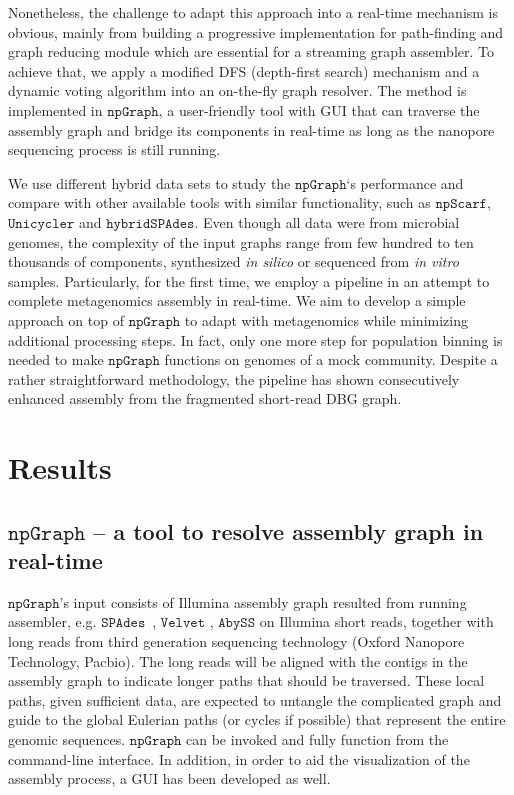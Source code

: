 \documentclass[10pt,twocolumn,twoside]{genpaper}
\newcommand{\npscarf}{$\mathtt{npScarf}$}
\newcommand{\npgraph}{$\mathtt{npGraph}$}
\newcommand{\unicycler}{$\mathtt{Unicycler}$}
\newcommand{\spades}{$\mathtt{SPAdes}$}
\newcommand{\hspades}{$\mathtt{hybridSPAdes}$}
\begin{document}
Nonetheless, the challenge to adapt this approach into a real-time mechanism is obvious, mainly from building a progressive implementation for path-finding and graph reducing module which are essential for a streaming graph assembler. 
To achieve that, we apply a modified DFS (depth-first search) mechanism and a dynamic voting algorithm into an on-the-fly graph resolver.
The method is implemented in \npgraph{}, a user-friendly tool with GUI that can traverse the assembly graph and bridge its components in real-time as long as the nanopore sequencing process is still running. 
 
We use different hybrid data sets to study the \npgraph{}`s performance and compare with other available tools with similar functionality, such as \npscarf{}, \unicycler{} and \hspades{}. Even though all data were from microbial genomes, the complexity of the input graphs range from few hundred to ten thousands of components, synthesized \emph{in silico} or sequenced from \emph{in vitro} samples.
Particularly, for the first time, we employ a pipeline in an attempt to complete metagenomics assembly in real-time. 
We aim to develop a simple approach on top of \npgraph{} to adapt with metagenomics while minimizing additional processing steps. In fact, only one more step for population binning is needed to make \npgraph{} functions on genomes of a mock community.
Despite a rather straightforward methodology, the pipeline has shown consecutively enhanced assembly from the fragmented short-read DBG graph.
\section*{Results}
\subsection*{\npgraph{} -- a tool to resolve assembly graph in real-time}
\npgraph{}'s input consists of Illumina assembly graph resulted from running assembler, e.g. \spades{}~\cite{BankevichNA2012}, $\mathtt{Velvet}$ \cite{Zerbino2008}, $\mathtt{AbySS}$ \cite{Simpson2009} on Illumina short reads, together with long reads from third generation sequencing technology (Oxford Nanopore Technology, Pacbio).
The long reads will be aligned with the contigs in the assembly graph to indicate longer paths that should be traversed. These local paths, given sufficient data, are expected to untangle the complicated graph and guide to the global Eulerian paths (or cycles if possible) that represent the entire genomic sequences. 
\npgraph{} can be invoked and fully function from the command-line interface. In addition, in order to aid the visualization of the assembly process, a GUI has been developed as well.
\end{document}
